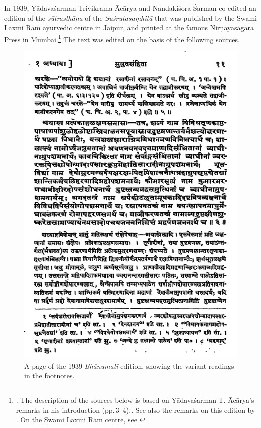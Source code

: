 In 1939, Yādavaśarman Trivikrama Ācārya and Nandakiśora Śarman co-edited an
edition of the \emph{sūtrasthāna} of the \emph{Suśrutasaṃhitā} that was published
by the Swami Laxmi Ram ayurvedic centre in Jaipur, and printed at the famous
Nirṇayasāgara Press in Mumbai.\footnote{\cite{acar-1939}.  The description of the sources 
below is based on Yādavaśarman T. Ācārya's  remarks in his introduction 
(pp.\,3--4).. See also the remarks on this edition by
\citet[7]{kleb-2021a}.  On the Swami Laxmi Ram
centre, see \cite{hofe-2007}} The text was edited on the basis of the following sources.
\begin{figure}[p]
    \centering
    \includegraphics[height=.9\textheight]{media/Bhanumati-page-11}
    \caption{A page of the 1939 \emph{Bhānumatī} edition, showing the variant readings in 
        the 
        footnotes.}
    \label{fig:bhanumati-page-11}
\end{figure}



